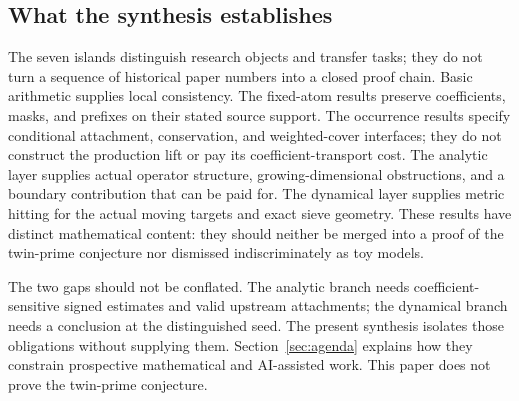\subsection{What the synthesis establishes}
The seven islands distinguish research objects and transfer tasks; they do not turn a sequence of historical paper numbers into a closed proof chain.
Basic arithmetic supplies local consistency. The fixed-atom results preserve coefficients, masks, and prefixes on their stated source support. The occurrence results specify conditional attachment, conservation, and weighted-cover interfaces; they do not construct the production lift or pay its coefficient-transport cost. The analytic layer supplies actual operator structure, growing-dimensional obstructions, and a boundary contribution that can be paid for. The dynamical layer supplies metric hitting for the actual moving targets and exact sieve geometry.
These results have distinct mathematical content: they should neither be merged into a proof of the twin-prime conjecture nor dismissed indiscriminately as toy models.

The two gaps should not be conflated. The analytic branch needs coefficient-sensitive signed estimates and valid upstream attachments; the dynamical branch needs a conclusion at the distinguished seed. The present synthesis isolates those obligations without supplying them. Section~\ref{sec:agenda} explains how they constrain prospective mathematical and AI-assisted work. This paper does not prove the twin-prime conjecture.
